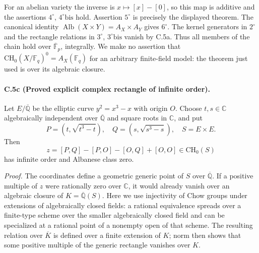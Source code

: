 For an abelian variety the inverse is $x\mapsto[x]-[0]$, so this map
is additive and the assertions $4^\circ$, $4^\circ\mathrm{bis}$ hold.
Assertion $5^\circ$ is precisely the displayed theorem. The canonical
identity $\operatorname{Alb}(X\times Y)=A_X\times A_Y$ gives
$6^\circ$. The kernel generators in $2^\circ$ and the rectangle
relations in $3^\circ$, $3^\circ\mathrm{bis}$ vanish by C.5a. Thus all
members of the chain hold over $\overline{\mathbb F}_p$, integrally.
We make no assertion that
$\mathrm{CH}_0(X/\mathbb F_q)^0=A_X(\mathbb F_q)$ for an arbitrary
finite-field model: the theorem just used is over its algebraic
closure.

\paragraph{C.5c (Proved explicit complex rectangle of infinite order).}
Let $E/\overline{\mathbb Q}$ be the elliptic curve
$y^2=x^3-x$ with origin $O$. Choose $t,s\in\mathbb C$ algebraically
independent over $\overline{\mathbb Q}$ and square roots in $\mathbb C$,
and put
\[
 P=(t,\sqrt{t^3-t}),\quad Q=(s,\sqrt{s^3-s}),\quad S=E\times E.
\]
Then
\begin{equation}\label{eq:explicit-rectangle}
 z=[P,Q]-[P,O]-[O,Q]+[O,O]\in\mathrm{CH}_0(S)
\end{equation}
has infinite order and Albanese class zero.

\emph{Proof.}
The coordinates define a geometric generic point of $S$ over
$\overline{\mathbb Q}$. If a positive multiple of $z$ were rationally
zero over $\mathbb C$, it would already vanish over an algebraic
closure of $K=\overline{\mathbb Q}(S)$. Here we use injectivity of
Chow groups under extensions of algebraically closed fields: a
rational equivalence spreads over a finite-type scheme over the
smaller algebraically closed field and can be specialized at a
rational point of a nonempty open of that scheme. The resulting
relation over $\overline K$ is defined over a finite extension of
$K$; norm then shows that some positive multiple of the generic
rectangle vanishes over $K$.

